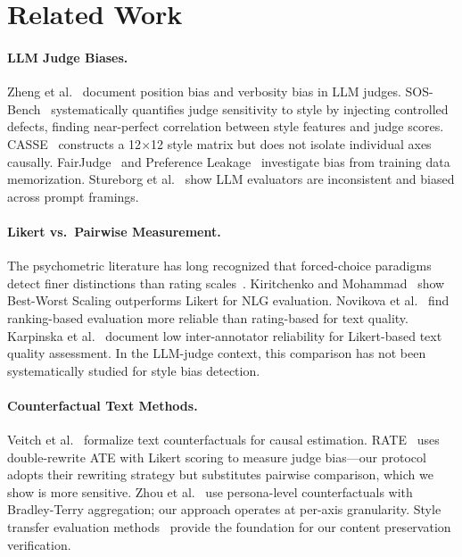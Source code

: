 \documentclass[11pt,a4paper]{article}
\begin{document}
\section{Related Work}

\paragraph{LLM Judge Biases.}
Zheng et al.~\cite{zheng2023judging} document position bias and verbosity bias in LLM judges.
SOS-Bench~\cite{sosbench2025} systematically quantifies judge sensitivity to style by injecting controlled defects, finding near-perfect correlation between style features and judge scores.
CASSE~\cite{casse2026} constructs a 12$\times$12 style matrix but does not isolate individual axes causally.
FairJudge~\cite{fairjudge2025} and Preference Leakage~\cite{preferenceleak2026} investigate bias from training data memorization.
Stureborg et al.~\cite{stureborg2024} show LLM evaluators are inconsistent and biased across prompt framings.

\paragraph{Likert vs.\ Pairwise Measurement.}
The psychometric literature has long recognized that forced-choice paradigms detect finer distinctions than rating scales~\cite{thurstone1927}.
Kiritchenko and Mohammad~\cite{kiritchenko2017} show Best-Worst Scaling outperforms Likert for NLG evaluation.
Novikova et al.~\cite{novikova2018} find ranking-based evaluation more reliable than rating-based for text quality.
Karpinska et al.~\cite{karpinska2021} document low inter-annotator reliability for Likert-based text quality assessment.
In the LLM-judge context, this comparison has not been systematically studied for style bias detection.

\paragraph{Counterfactual Text Methods.}
Veitch et al.~\cite{veitch2020} formalize text counterfactuals for causal estimation.
RATE~\cite{ratebias2025} uses double-rewrite ATE with Likert scoring to measure judge bias---our protocol adopts their rewriting strategy but substitutes pairwise comparison, which we show is more sensitive.
Zhou et al.~\cite{zhou2025counterfactual} use persona-level counterfactuals with Bradley-Terry aggregation; our approach operates at per-axis granularity.
Style transfer evaluation methods~\cite{mir2019,krishna2020} provide the foundation for our content preservation verification.
\end{document}
